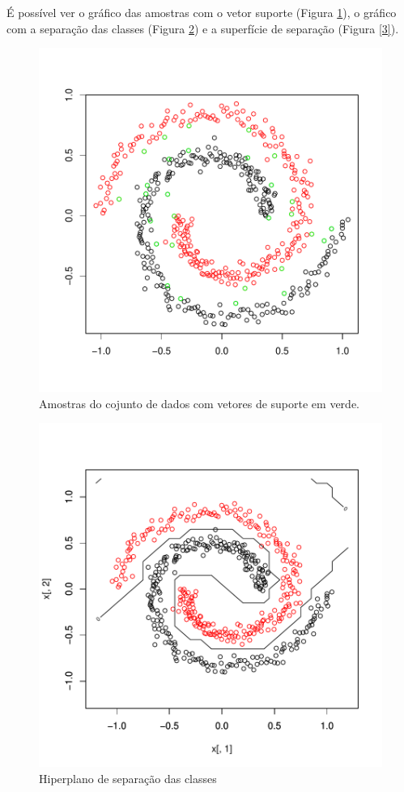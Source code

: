 \documentclass[12pt]{article}
\begin{document}
  \par É possível ver o gráfico das amostras com o vetor suporte (Figura \ref{1}), o gráfico com a separação das classes (Figura \ref{2}) e a superfície de separação (Figura \ref{3}).
\begin{figure}[!h]
\centering
\includegraphics{SVM-005}
\caption{Amostras do cojunto de dados com vetores de suporte em verde.}
\label{1}
\end{figure}

\begin{figure}[!h]
\centering
\includegraphics{SVM-006}
\caption{Hiperplano de separação das classes}
\label{2}
\end{figure}
\end{document}
